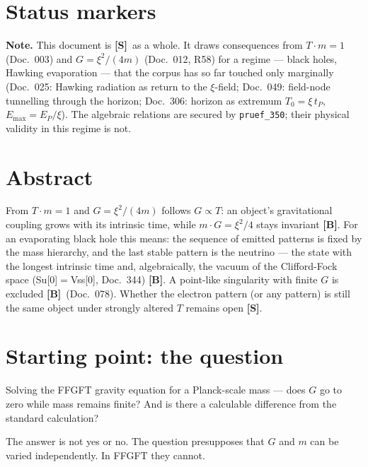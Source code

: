 
\providecommand{\BM}{\textbf{[B]}}
\providecommand{\KM}{\textbf{[K]}}
\providecommand{\SM}{\textbf{[S]}}

{}

\section*{Status markers}


\textbf{Note.} This document is \SM\ as a whole. It draws consequences from
$T\cdot m=1$ (Doc.~003) and $G=\xi^2/(4m)$ (Doc.~012, R58) for a regime ---
black holes, Hawking evaporation --- that the corpus has so far touched only
marginally (Doc.~025: Hawking radiation as return to the $\xi$-field;
Doc.~049: field-node tunnelling through the horizon; Doc.~306: horizon as
extremum $T_0=\xi\,t_P$, $E_\text{max}=E_P/\xi$). The algebraic relations
are secured by \texttt{pruef\_350}; their physical validity in this regime is
not.

\section*{Abstract}

From $T\cdot m=1$ and $G=\xi^2/(4m)$ follows $G\propto T$: an object's
gravitational coupling grows with its intrinsic time, while $m\cdot G=\xi^2/4$
stays invariant \BM. For an evaporating black hole this means: the sequence
of emitted patterns is fixed by the mass hierarchy, and the last stable
pattern is the neutrino --- the state with the longest intrinsic time and,
algebraically, the vacuum of the Clifford-Fock space (Su[0]$=$Vss[0],
Doc.~344) \BM. A point-like singularity with finite $G$ is excluded \BM\ (Doc.~078).
Whether the electron pattern (or any pattern) is still the same object under
strongly altered $T$ remains open \SM.

\section{Starting point: the question}

Solving the FFGFT gravity equation for a Planck-scale mass --- does $G$
go to zero while mass remains finite? And is there a calculable difference
from the standard calculation?

The answer is not yes or no. The question presupposes that $G$ and $m$ can
be varied independently. In FFGFT they cannot.

